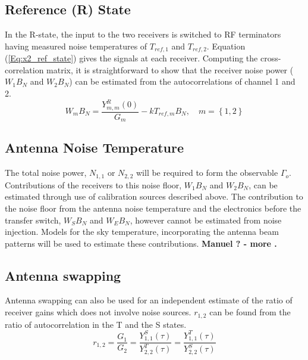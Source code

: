 \documentclass[draftcls,onecolumn]{IEEEtran}  %
\begin{document}
\subsection{Reference (R)  State}
\label{ssec:ref}
In the R-state, the input to the two receivers is switched to  RF terminators having measured noise temperatures of $T_{ref,1}$ and $T_{ref,2}$.
Equation (\ref{Eq:x2_ref_state}) gives the signals at each receiver.  
Computing the cross-correlation matrix, it is straightforward to show that the receiver noise power ($W_1 B_N$ and $W_2 B_N$) can be estimated from the autocorrelations of channel 1 and 2. 
\begin{equation}
W_m B_N = \frac{Y_{m,m}^R(0)}{G_m} - k T_{ref,m} B_N, \,\,\,\,\,\,  m =\left\{1,2\right\}
\label{eqn:refstate}
\end{equation}

\subsection{Antenna Noise Temperature}
\label{ssec:tant}
The total noise power, $N_{1,1}$ or $N_{2,2}$ will be required to form the observable $\Gamma_{o}$. 
Contributions of the receivers to this noise floor, $W_1 B_N$ and $W_2 B_N$, can be estimated through use of calibration  sources described above. 
The contribution to the noise floor from the antenna noise temperature and the electronics before the transfer switch, $W_S B_N$ and $W_E B_N$, however cannot be estimated from noise injection. 
Models for the sky temperature, incorporating the antenna beam patterns will be used to estimate these contributions.
\bf Manuel ? - more \rm. 

\subsection{Antenna swapping}
Antenna swapping \cite{Alejandro:2013} can also be used for an independent estimate of the ratio of receiver gains %
which does not involve noise sources. 
$r_{1,2}$ can be found from the ratio of autocorrelation in the T and the S states. 
\begin{equation}
  r_{1,2} = \frac{G_1}{G_2} = \frac{Y_{1,1}^S(\tau)}{Y_{2,2}^T(\tau)} = \frac{Y_{1,1}^T(\tau)}{Y_{2,2}^S(\tau)}
    \label{Eq: Cal_channel_gain_ratio}
\end{equation}
\end{document}
